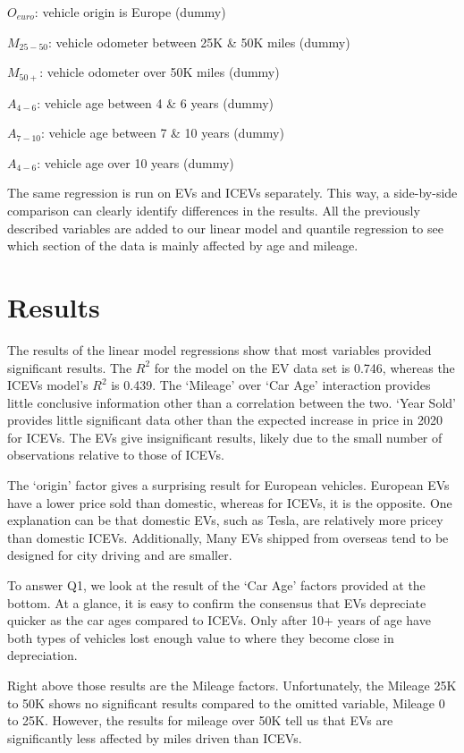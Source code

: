 \documentclass{article}
\begin{document}
\(O_{euro}\): vehicle origin is Europe (dummy)

\(M_{25-50}\): vehicle odometer between 25K \& 50K miles (dummy)

\(M_{50+}\): vehicle odometer over 50K miles (dummy)

\(A_{4-6}\): vehicle age between 4 \& 6 years (dummy)

\(A_{7-10}\): vehicle age between 7 \& 10 years (dummy)

\(A_{4-6}\): vehicle age over 10 years (dummy)

The same regression is run on EVs and ICEVs separately. This way, a
side-by-side comparison can clearly identify differences in the results.
All the previously described variables are added to our linear model and
quantile regression to see which section of the data is mainly affected
by age and mileage.

\hypertarget{results}{%
\section{Results}\label{results}}

The results of the linear model regressions show that most variables
provided significant results. The \(R^2\) for the model on the EV data
set is 0.746, whereas the ICEVs model's \(R^2\) is 0.439. The `Mileage'
over `Car Age' interaction provides little conclusive information other
than a correlation between the two. `Year Sold' provides little
significant data other than the expected increase in price in 2020 for
ICEVs. The EVs give insignificant results, likely due to the small
number of observations relative to those of ICEVs.

The `origin' factor gives a surprising result for European vehicles.
European EVs have a lower price sold than domestic, whereas for ICEVs,
it is the opposite. One explanation can be that domestic EVs, such as
Tesla, are relatively more pricey than domestic ICEVs. Additionally,
Many EVs shipped from overseas tend to be designed for city driving and
are smaller.

To answer Q1, we look at the result of the `Car Age' factors provided at
the bottom. At a glance, it is easy to confirm the consensus that EVs
depreciate quicker as the car ages compared to ICEVs. Only after 10+
years of age have both types of vehicles lost enough value to where they
become close in depreciation.

Right above those results are the Mileage factors. Unfortunately, the
Mileage 25K to 50K shows no significant results compared to the omitted
variable, Mileage 0 to 25K. However, the results for mileage over 50K
tell us that EVs are significantly less affected by miles driven than
ICEVs.
\end{document}
